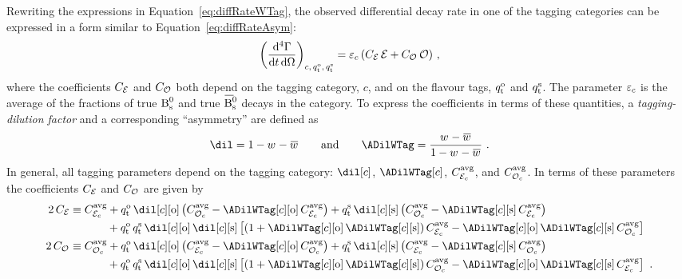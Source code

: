 Rewriting the expressions in Equation~\ref{eq:diffRateWTag}, the observed differential decay rate in one of the tagging categories can be
expressed in a form similar to Equation~\ref{eq:diffRateAsym}:
\begin{equation}
  \label{eq:diffRateTags}
  \left(\frac{\ud^4\Gamma}{\ud t\, \ud\Omega}\right)_{c,\,\qtOS,\,\qtSS}
      = \tagCatCoef[c]\, (\CEven\, \even + \COdd\, \odd) \ ,
\end{equation}
where the coefficients $\CEven$ and $\COdd$ both depend on the tagging category, $c$, and on the flavour tags, $\qtOS$ and $\qtSS$. The
parameter $\tagCatCoef[c]$ is the average of the fractions of true $\Bs$ and true $\Bsbar$ decays in the category. To express the
coefficients in terms of these quantities, a \emph{tagging-dilution factor} and a corresponding ``asymmetry'' are defined as
\begin{equation}
  \dil = 1 - \wTag - \wTagBar  \qquad\text{and}\qquad  \ADilWTag = \frac{\wTag-\wTagBar}{1 - \wTag - \wTagBar} \ .
\end{equation}
In general, all tagging parameters depend on the tagging category: $\dil[c]$, $\ADilWTag[c]$, $\avgCEven[c]$, and $\avgCOdd[c]$. In terms
of these parameters the coefficients $\CEven$ and $\COdd$ are given by
\begin{subequations}
  \label{eq:evenOddTagCoefs}
  \begin{align}
    2\,\CEven &\equiv \avgCEven[c]
                         + \qtOS\,\dilOS[c]\left(\avgCOdd[c] - \ADilWTagOS[c]\,\avgCEven[c] \right)
                         + \qtSS\,\dilSS[c]\left(\avgCOdd[c] - \ADilWTagSS[c]\,\avgCEven[c] \right) \nonumber\\
                         &\qquad\quad\
                           + \qtOS\,\qtSS\,\dilOS[c]\,\dilSS[c]\left[(1 + \ADilWTagOS[c]\,\ADilWTagSS[c])\,\avgCEven[c]
                                                                  - \ADilWTagOS[c]\,\ADilWTagSS[c]\,\avgCOdd[c] \right] \\
    2\,\COdd &\equiv \avgCOdd[c]
                        + \qtOS\,\dilOS[c]\left(\avgCEven[c] - \ADilWTagOS[c]\,\avgCOdd[c] \right)
                        + \qtSS\,\dilSS[c]\left(\avgCEven[c] - \ADilWTagSS[c]\,\avgCOdd[c] \right) \nonumber\\
                        &\qquad\quad\
                          + \qtOS\,\qtSS\,\dilOS[c]\,\dilSS[c]\left[(1 + \ADilWTagOS[c]\,\ADilWTagSS[c])\,\avgCOdd[c]
                                                                  - \ADilWTagOS[c]\,\ADilWTagSS[c]\,\avgCEven[c] \right] \ .
  \end{align}
\end{subequations}

